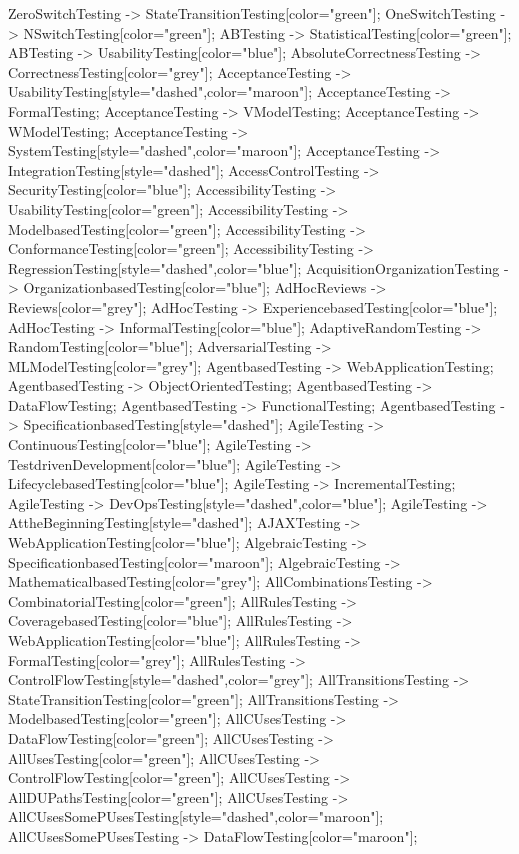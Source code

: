 \documentclass{article}
\begin{document}
{ZeroSwitchTesting -> StateTransitionTesting[color="green"];
OneSwitchTesting -> NSwitchTesting[color="green"];
ABTesting -> StatisticalTesting[color="green"];
ABTesting -> UsabilityTesting[color="blue"];
AbsoluteCorrectnessTesting -> CorrectnessTesting[color="grey"];
AcceptanceTesting -> UsabilityTesting[style="dashed",color="maroon"];
AcceptanceTesting -> FormalTesting;
AcceptanceTesting -> VModelTesting;
AcceptanceTesting -> WModelTesting;
AcceptanceTesting -> SystemTesting[style="dashed",color="maroon"];
AcceptanceTesting -> IntegrationTesting[style="dashed"];
AccessControlTesting -> SecurityTesting[color="blue"];
AccessibilityTesting -> UsabilityTesting[color="green"];
AccessibilityTesting -> ModelbasedTesting[color="green"];
AccessibilityTesting -> ConformanceTesting[color="green"];
AccessibilityTesting -> RegressionTesting[style="dashed",color="blue"];
AcquisitionOrganizationTesting -> OrganizationbasedTesting[color="blue"];
AdHocReviews -> Reviews[color="grey"];
AdHocTesting -> ExperiencebasedTesting[color="blue"];
AdHocTesting -> InformalTesting[color="blue"];
AdaptiveRandomTesting -> RandomTesting[color="blue"];
AdversarialTesting -> MLModelTesting[color="grey"];
AgentbasedTesting -> WebApplicationTesting;
AgentbasedTesting -> ObjectOrientedTesting;
AgentbasedTesting -> DataFlowTesting;
AgentbasedTesting -> FunctionalTesting;
AgentbasedTesting -> SpecificationbasedTesting[style="dashed"];
AgileTesting -> ContinuousTesting[color="blue"];
AgileTesting -> TestdrivenDevelopment[color="blue"];
AgileTesting -> LifecyclebasedTesting[color="blue"];
AgileTesting -> IncrementalTesting;
AgileTesting -> DevOpsTesting[style="dashed",color="blue"];
AgileTesting -> AttheBeginningTesting[style="dashed"];
AJAXTesting -> WebApplicationTesting[color="blue"];
AlgebraicTesting -> SpecificationbasedTesting[color="maroon"];
AlgebraicTesting -> MathematicalbasedTesting[color="grey"];
AllCombinationsTesting -> CombinatorialTesting[color="green"];
AllRulesTesting -> CoveragebasedTesting[color="blue"];
AllRulesTesting -> WebApplicationTesting[color="blue"];
AllRulesTesting -> FormalTesting[color="grey"];
AllRulesTesting -> ControlFlowTesting[style="dashed",color="grey"];
AllTransitionsTesting -> StateTransitionTesting[color="green"];
AllTransitionsTesting -> ModelbasedTesting[color="green"];
AllCUsesTesting -> DataFlowTesting[color="green"];
AllCUsesTesting -> AllUsesTesting[color="green"];
AllCUsesTesting -> ControlFlowTesting[color="green"];
AllCUsesTesting -> AllDUPathsTesting[color="green"];
AllCUsesTesting -> AllCUsesSomePUsesTesting[style="dashed",color="maroon"];
AllCUsesSomePUsesTesting -> DataFlowTesting[color="maroon"];
}
\end{document}
